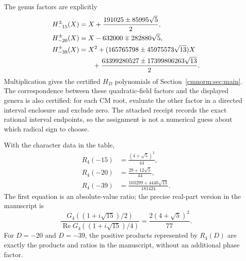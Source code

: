 The genus factors are explicitly
\begin{align}
 H_{-15}^{\pm}(X)
 &=X+\frac{191025\pm85995\sqrt5}{2},
       \label{cmgenus:eq:h15}\\
 H_{-20}^{\pm}(X)
 &=X-632000\mp282880\sqrt5,
       \label{cmgenus:eq:h20}\\
 H_{-39}^{\pm}(X)
 &=X^2+(165765798\pm45975573\sqrt{13})X\notag\\
 &\hspace{2em}+\frac{63399280527\pm17399806263\sqrt{13}}2.
       \label{cmgenus:eq:h39}
\end{align}
Multiplication gives the certified $H_D$ polynomials of
Section~\ref{cmnorm:sec:main}. The correspondence between these
quadratic-field factors and the displayed genera is also certified:
for each CM root, evaluate the other factor in a directed interval
enclosure and exclude zero. The attached receipt records the exact
rational interval endpoints, so the assignment is not a numerical
guess about which radical sign to choose.

\begin{theorem}
\label{cmgenus:thm:four}
With the character data in the table,
\begin{align}
 R_4(-15)&=\frac{(4+\sqrt5)^2}{44},
       \label{cmgenus:eq:r415}\\
 R_4(-20)&=\frac{29+12\sqrt5}{44},
       \label{cmgenus:eq:r420}\\
 R_4(-39)&=\frac{103299+4440\sqrt{13}}{181424}.
       \label{cmgenus:eq:r439}
\end{align}
The first equation is an absolute-value ratio; the precise real-part
version in the manuscript is
\begin{equation}
 \frac{G_4((1+i\sqrt{15})/2)}
      {\operatorname{Re}G_4((1+i\sqrt{15})/4)}
 =\frac{2(4+\sqrt5)^2}{77}.
 \label{cmgenus:eq:recorded15}
\end{equation}
For $D=-20$ and $D=-39$, the positive products represented by
$R_4(D)$ are exactly the products and ratios in the manuscript, without
an additional phase factor.
\end{theorem}

